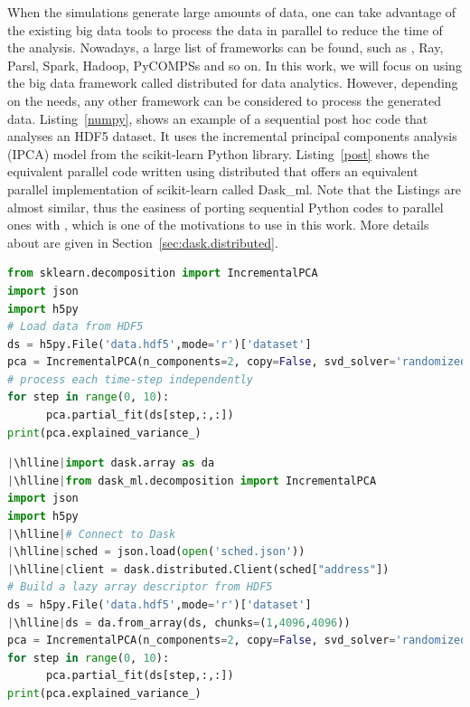 When the simulations generate large amounts of data, one can take advantage of the existing big data tools to process the data in parallel to reduce the time of the analysis. Nowadays, a large list of frameworks can be found, such as \dask, Ray, Parsl, Spark, Hadoop, PyCOMPSs and so on.   
In this work, we will focus on using the big data framework called \dask distributed for data analytics. However, depending on the needs, any other framework can be considered to process the generated data.
Listing~\ref{numpy}, shows an example of a sequential post hoc code that analyses an HDF5 dataset. It uses the incremental principal components analysis (IPCA) model from the scikit-learn Python library. Listing~\ref{post} shows the equivalent parallel code written using \dask distributed that offers an equivalent parallel implementation of scikit-learn called Dask\_ml. Note that the Listings are almost similar, thus the easiness of porting sequential Python codes to parallel ones with \dask, which is one of the motivations to use \dask in this work.   
More details about \dask are given in Section~\ref{sec:dask.distributed}.

\begin{lstlisting}[float=h!, label=numpy, language=python, caption=Sequential post hoc data analysis with scikit-learn]
from sklearn.decomposition import IncrementalPCA
import json
import h5py
# Load data from HDF5
ds = h5py.File('data.hdf5',mode='r')['dataset']
pca = IncrementalPCA(n_components=2, copy=False, svd_solver='randomized')
# process each time-step independently
for step in range(0, 10):
      pca.partial_fit(ds[step,:,:])
print(pca.explained_variance_)
\end{lstlisting}

\begin{lstlisting}[float=h!, label=post, language=python, caption=Parallel post hoc data analysis with \dask. Lines differing from the analysis of Listing~\ref{numpy} are highlighted]
|\hlline|import dask.array as da
|\hlline|from dask_ml.decomposition import IncrementalPCA
import json
import h5py
|\hlline|# Connect to Dask
|\hlline|sched = json.load(open('sched.json'))
|\hlline|client = dask.distributed.Client(sched["address"])
# Build a lazy array descriptor from HDF5
ds = h5py.File('data.hdf5',mode='r')['dataset']
|\hlline|ds = da.from_array(ds, chunks=(1,4096,4096))
pca = IncrementalPCA(n_components=2, copy=False, svd_solver='randomized')
for step in range(0, 10):
      pca.partial_fit(ds[step,:,:])
print(pca.explained_variance_)
\end{lstlisting}


